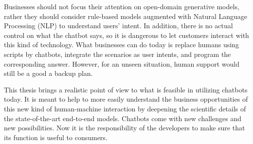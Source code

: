 Businesses should not focus their attention on open-domain generative models, rather they should consider rule-based models augmented with Natural Language Processing (NLP) to understand users' intent. In addition, there is no actual control on what the chatbot says, so it is dangerous to let customers interact with this kind of technology.
What businesses can do today is replace humans using scripts by chatbots, integrate the scenarios as user intents, and program the corresponding answer. However, for an unseen situation, human support would still be a good a backup plan.

This thesis brings a realistic point of view to what is feasible in utilizing chatbots today. It is meant to help to more easily understand the business opportunities of this new kind of human-machine interaction by deepening the scientific details of the state-of-the-art end-to-end models.
Chatbots come with new challenges and new possibilities. Now it is the responsibility of the developers to make sure that its function is useful to consumers.
